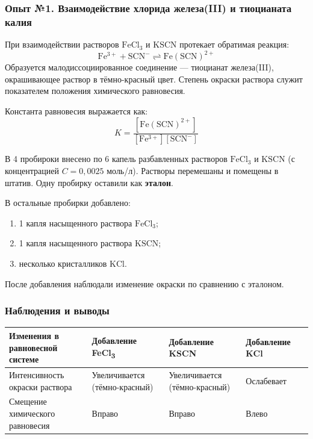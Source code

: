 \documentclass[a4paper,12pt]{article}
\begin{document}
	
	\subsubsection*{Опыт №1. Взаимодействие хлорида железа(III) и тиоцианата калия}
	
	При взаимодействии растворов \(\mathrm{FeCl_3}\) и \(\mathrm{KSCN}\) протекает обратимая реакция:
	\[
	\mathrm{Fe^{3+} + SCN^- \rightleftharpoons Fe(SCN)^{2+}}
	\]
	Образуется малодиссоциированное соединение --- тиоцианат железа(III), окрашивающее раствор в тёмно-красный цвет.  
	Степень окраски раствора служит показателем положения химического равновесия.
	
	Константа равновесия выражается как:
	\[
	K = \frac{[\mathrm{Fe(SCN)^{2+}}]}{[\mathrm{Fe^{3+}}][\mathrm{SCN^-}]}
	\]
	
	В 4 пробироки внесено по 6 капель разбавленных растворов \(\mathrm{FeCl_3}\) и \(\mathrm{KSCN}\) (с концентрацией \(C = 0{,}0025\) моль/л).  
	Растворы перемешаны и помещены в штатив. Одну пробирку оставили как \textbf{эталон}.  
	
	В остальные пробирки добавлено:
	\begin{enumerate}
		\item 1 капля насыщенного раствора \(\mathrm{FeCl_3}\);
		\item 1 капля насыщенного раствора \(\mathrm{KSCN}\);
		\item несколько кристалликов \(\mathrm{KCl}\).
	\end{enumerate}
	
	После добавления наблюдали изменение окраски по сравнению с эталоном.
	
	\subsubsection*{Наблюдения и выводы}
	
	\begin{center}
		\renewcommand{\arraystretch}{1.3} %
		\setlength{\extrarowheight}{2pt}
		\begin{tabularx}{\textwidth}{|>{\raggedright\arraybackslash}X|
				>{\centering\arraybackslash}m{2.8cm}|
				>{\centering\arraybackslash}m{2.8cm}|
				>{\centering\arraybackslash}m{2.8cm}|
				>{\centering\arraybackslash}m{2.8cm}|}
			\hline
			\textbf{Изменения в равновесной системе} &
			\textbf{Добавление FeCl\textsubscript{3}} &
			\textbf{Добавление KSCN} &
			\textbf{Добавление KCl} \\ \hline
			Интенсивность окраски раствора &
			Увеличивается (тёмно-красный) &
			Увеличивается (тёмно-красный) &
			Ослабевает \\ \hline
			Смещение химического равновесия &
			Вправо &
			Вправо &
			Влево \\ \hline
		\end{tabularx}
	\end{center}
	
\end{document}
